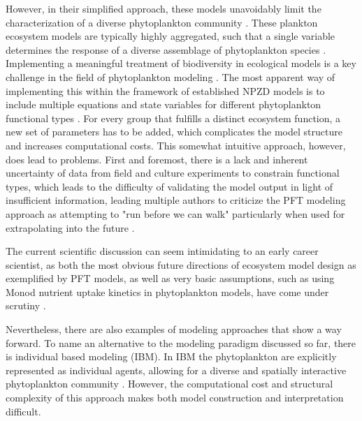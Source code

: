 However, in their simplified approach, these models unavoidably limit the characterization of a diverse phytoplankton community \citep{Bruggeman2009}.
 These plankton ecosystem models are typically highly aggregated, such that a single variable determines the response of a diverse assemblage of phytoplankton species \citep{Franks2009}. Implementing a meaningful treatment of biodiversity in ecological models is a key challenge in the field of phytoplankton modeling \citep{Queiros2015}. The most apparent way of implementing this within the framework of established NPZD models is to include multiple equations and state variables for different phytoplankton functional types \citep{LeQuere2005}. For every group that fulfills a distinct ecosystem function, a new set of parameters has to be added, which complicates the model structure and increases computational costs. This somewhat intuitive approach, however, does lead to problems. First and foremost, there is a lack and inherent uncertainty of data from field and culture experiments to constrain functional types, which leads to the difficulty of validating the model output in light of insufficient information, leading multiple authors to criticize the PFT modeling approach as attempting to "run before we can walk" particularly when used for extrapolating into the future \citep{Anderson2005,Shimoda2016}. 

The current scientific discussion can seem intimidating to an early career scientist, as both the most obvious future directions of ecosystem model design as exemplified by PFT models, as well as very basic assumptions, such as using Monod nutrient uptake kinetics in phytoplankton models, have come under scrutiny \citep{Flynn2010, Smith2014, Hellweger2017a}.


Nevertheless, there are also examples of modeling approaches that show a way forward. To name an alternative to the modeling paradigm discussed so far, there is individual based modeling (IBM). In IBM the phytoplankton are explicitly represented as individual agents, allowing for a diverse and spatially interactive phytoplankton community \citep{Hellweger2009}. However, the computational cost and structural complexity of this approach makes both model construction and interpretation difficult. 

